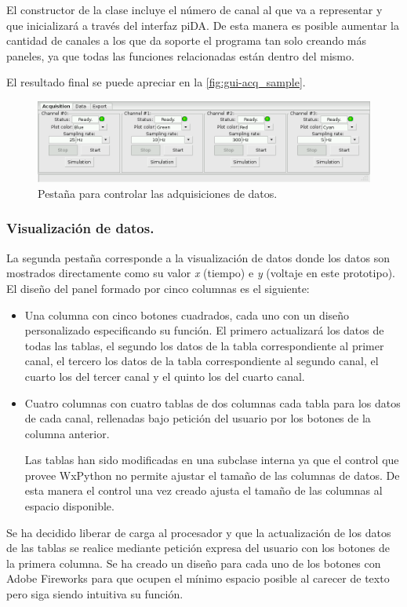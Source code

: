	El constructor de la clase incluye el número de canal al que va a representar y que inicializará a través del interfaz piDA. De esta manera es posible aumentar la cantidad de canales a los que da soporte el programa tan solo creando más paneles, ya que todas las funciones relacionadas están dentro del mismo.
	
	El resultado final se puede apreciar en la \autoref{fig:gui-acq_sample}.
	
\begin{figure}[hc]

  \includegraphics[width=1\textwidth]{img/gui-acq_sample.png}
  \caption{Pestaña para controlar las adquisiciones de datos.}
  \label{fig:gui-acq_sample}
\end{figure}
	\subsubsection{Visualización de datos.}\label{sec:gui_DataGUI}
	La segunda pestaña corresponde a la visualización de datos donde los datos son mostrados directamente como su valor \emph{x} (tiempo) e \emph{y} (voltaje en este prototipo). El diseño del panel formado por cinco columnas es el siguiente:
\begin{itemize}
	\item Una columna con cinco botones cuadrados, cada uno con un diseño personalizado especificando su función. El primero actualizará los datos de todas las tablas, el segundo los datos de la tabla correspondiente al primer canal, el tercero los datos de la tabla correspondiente al segundo canal, el cuarto los del tercer canal y el quinto los del cuarto canal.
	\item Cuatro columnas con cuatro tablas de dos columnas cada tabla para los datos de cada canal, rellenadas bajo petición del usuario por los botones de la columna anterior.
	
	Las tablas han sido modificadas en una subclase interna ya que el control que provee WxPython no permite ajustar el tamaño de las columnas de datos.  De esta manera el control una vez creado ajusta el tamaño de las columnas al espacio disponible.
\end{itemize}
	Se ha decidido liberar de carga al procesador y que la actualización de los datos de las tablas se realice mediante petición expresa del usuario con los botones de la primera columna. Se ha creado un diseño para cada uno de los botones con Adobe Fireworks\cite{adobe_fireworks} para que ocupen el mínimo espacio posible al carecer de texto pero siga siendo intuitiva su función.

